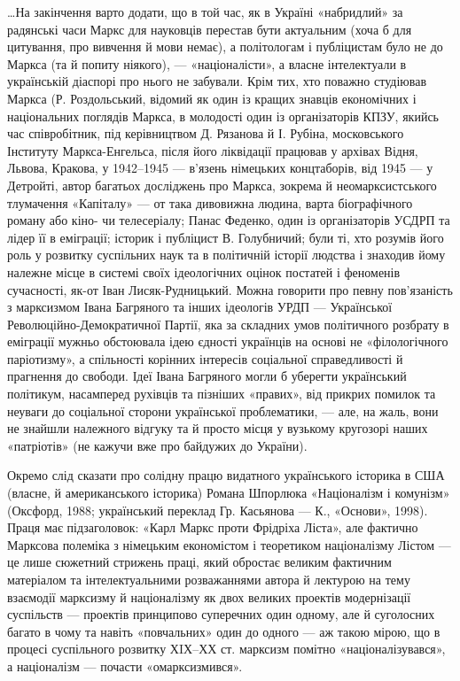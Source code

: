 \ldots{}На закінчення варто додати, що в той час, як в Україні «набридлий» 
за радянські часи Маркс для науковців перестав бути актуальним (хоча б 
для цитування, про вивчення й мови немає), а політологам і публіцистам 
було не до Маркса (та й попиту ніякого), — «націоналісти», а власне 
інтелектуали в українській діаспорі про нього не забували. Крім тих, 
хто поважно студіював Маркса (Р. Роздольський, відомий як один із 
кращих знавців економічних і національних поглядів Маркса, в 
молодості один із організаторів КПЗУ, якийсь час співробітник, під 
керівництвом Д. Рязанова й І. Рубіна, московського Інституту 
Маркса-Енгельса, після його ліквідації працював у архівах Відня, 
Львова, Кракова, у 1942--1945 — в'язень німецьких концтаборів, від 1945 — у 
Детройті, автор багатьох досліджень про Маркса, зокрема й 
неомарксистського тлумачення «Капіталу» — от така дивовижна людина, 
варта біографічного роману або кіно- чи телесеріалу; Панас Феденко, 
один із організаторів УСДРП та лідер її в еміграції; історик і 
публіцист В. Голубничий; були ті, хто розумів його роль у розвитку 
суспільних наук та в політичній історії людства і знаходив йому 
належне місце в системі своїх ідеологічних оцінок постатей і 
феноменів сучасності, як-от Іван Лисяк-Рудницький. Можна говорити про 
певну пов'язаність з марксизмом Івана Багряного та інших ідеологів 
УРДП — Української Революційно-Демократичної Партії, яка за складних 
умов політичного розбрату в еміграції мужньо обстоювала ідею єдності 
українців на основі не «філологічного паріотизму», а спільності 
корінних інтересів соціальної справедливості й прагнення до свободи. 
Ідеї Івана Багряного могли б уберегти український політикум, 
насамперед рухівців та пізніших «правих», від прикрих помилок та 
неуваги до соціальної сторони української проблематики, — але, на 
жаль, вони не знайшли належного відгуку та й просто місця у вузькому 
кругозорі наших «патріотів» (не кажучи вже про байдужих до України). 


Окремо слід сказати про солідну працю видатного українського 
історика в США (власне, й американського історика) Романа Шпорлюка 
«Націоналізм і комунізм» (Оксфорд, 1988; український переклад Гр. 
Касьянова — К., «Основи», 1998). Праця має підзаголовок: «Карл Маркс проти 
Фрідріха Ліста», але фактично Марксова полеміка з німецьким 
економістом і теоретиком націоналізму Лістом — це лише сюжетний 
стрижень праці, який обростає великим фактичним матеріалом та 
інтелектуальними розважаннями автора й лектурою на тему взаємодії 
марксизму й націоналізму як двох великих проектів модернізації 
суспільств — проектів принципово суперечних один одному, але й 
суголосних багато в чому та навіть «повчальних» один до одного — аж 
такою мірою, що в процесі суспільного розвитку ХIХ--ХХ ст. марксизм 
помітно «націоналізувався», а націоналізм — почасти «омарксизмився».


